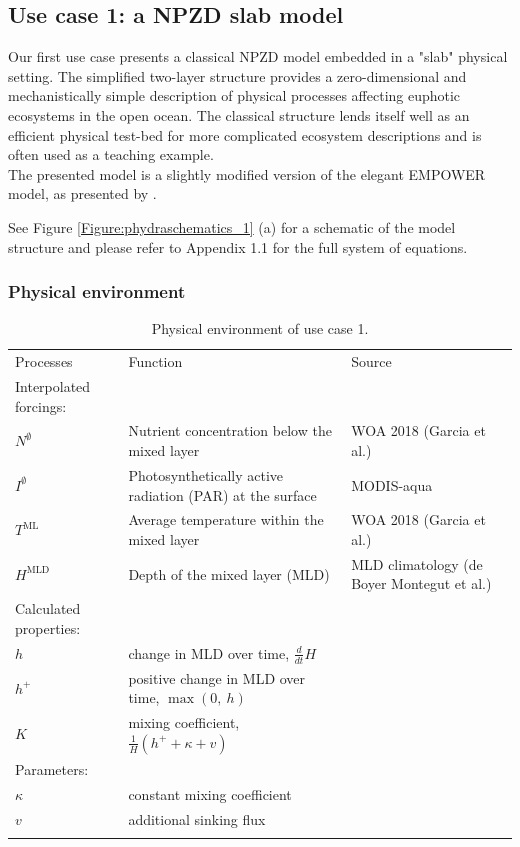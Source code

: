 \documentclass[template.tex]{subfiles}
\begin{document}
\subsection{Use case 1: a NPZD slab model}
Our first use case presents a classical NPZD model embedded in a "slab" physical setting. The simplified two-layer structure provides a zero-dimensional and mechanistically simple description of physical processes affecting euphotic ecosystems in the open ocean. The classical structure lends itself well as an efficient physical test-bed for more complicated ecosystem descriptions and is often used as a teaching example.
\\
The presented model is a slightly modified version of the elegant EMPOWER model, as presented by \citet{Anderson2015c}. 


See Figure \ref{Figure:phydraschematics_1} (a) for a schematic of the model structure and please refer to Appendix 1.1 for the full system of equations.


\subsubsection{Physical environment}

\begin{table}[t]
\caption{Physical environment of use case 1. }
\begin{tabular}{l l l}
Processes & Function & Source \\
\tophline
Interpolated forcings:\\
$N^\emptyset$ & Nutrient concentration below the mixed layer &  WOA 2018 (Garcia et al.) \\
$I^\emptyset$ & Photosynthetically active radiation (PAR) at the surface &  MODIS-aqua \\
$T^{\mathrm{ML}}$ & Average temperature within the mixed layer & WOA 2018 (Garcia et al.) \\
$H^{\mathrm{MLD}}$ & Depth of the mixed layer (MLD) &  MLD climatology (de Boyer Montegut et al.)\\


Calculated properties:\\
$h$ & change in MLD over time, $\frac{d}{d t} H$ & \\
$h^+$ & positive change in MLD over time, $\max(0, \ h)$  & \\
$K$ & mixing coefficient, $\frac{1}{H}(h^{+} + \kappa + v)$ & \\

Parameters: \\
$\kappa$ & constant mixing coefficient & \\
$v$ & additional sinking flux & \\

\bottomhline
\end{tabular}
\label{Table:UseCase1PhysEnv}
\end{table}
%
\end{document}
